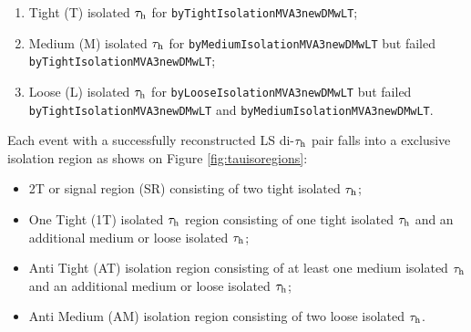  	
 	\begin{enumerate}
 		\item Tight (T) isolated $\tau_{\text{h}}$ for \texttt{byTight\-Isolation\-MVA3\-newDMwLT};
 		\item Medium (M) isolated $\tau_{\text{h}}$ for \texttt{byMedium\-Isolation\-MVA3\-newDMwLT} but failed \texttt{byTight\-Isolation\-MVA3\-newDMwLT};
 		\item Loose (L) isolated $\tau_{\text{h}}$  for \texttt{byLoose\-Isolation\-MVA3\-newDMwLT} but failed \texttt{byTight\-Isolation\-MVA3\-newDMwLT} and \texttt{byMedium\-Isolation\-MVA3\-newDMwLT}.
 	\end{enumerate}
 	
Each event with a successfully reconstructed LS di-$\tau_{\text{h}}$ pair falls into a exclusive isolation region as shows on Figure \ref{fig:tauisoregions}:
 	
 	\begin{itemize}
 		\item 2T or signal region (SR) consisting of two tight isolated $\tau_{\text{h}}$;
 		\item One Tight (1T) isolated $\tau_{\text{h}}$ region consisting of one tight isolated $\tau_{\text{h}}$ and an additional medium or loose isolated $\tau_{\text{h}}$;
 		\item  Anti Tight (AT) isolation region consisting of at least one medium isolated $\tau_{\text{h}}$ and an additional medium or loose isolated $\tau_{\text{h}}$;
 		\item  Anti Medium (AM) isolation region consisting of two loose isolated $\tau_{\text{h}}$.
 	\end{itemize}
 
